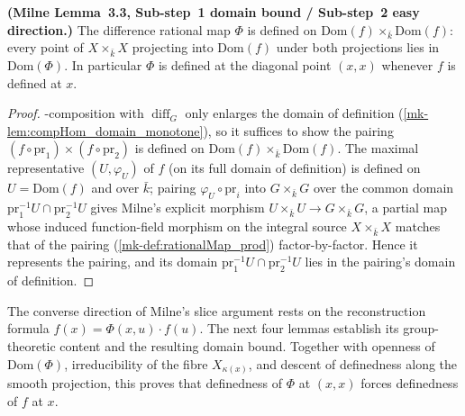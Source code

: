\begin{lemma}\label{mk-lem:difference_map_domain_lower_bound}
  \leanok

  \textbf{(Milne Lemma~3.3, Sub-step~1 domain bound / Sub-step~2 easy direction.)} The
  difference rational map \(\Phi\) is defined on \(\mathrm{Dom}(f) \times_{\bar k}
  \mathrm{Dom}(f)\): every point of \(X \times_{\bar k} X\) projecting into
  \(\mathrm{Dom}(f)\) under both projections lies in \(\mathrm{Dom}(\Phi)\). In
  particular \(\Phi\) is defined at the diagonal point \((x, x)\) whenever \(f\) is
  defined at \(x\).
\end{lemma}
\begin{proof}
  \leanokRight-composition with \(\operatorname{diff}_G\) only enlarges the domain of
  definition (\ref{mk-lem:compHom_domain_monotone}), so it suffices to show the pairing
  \((f \circ \mathrm{pr}_1) \times (f \circ \mathrm{pr}_2)\) is defined on
  \(\mathrm{Dom}(f) \times_{\bar k} \mathrm{Dom}(f)\). The maximal representative
  \((U, \varphi_U)\) of \(f\) (on its full domain of definition) is defined on \(U =
  \mathrm{Dom}(f)\) and over \(\bar k\); pairing \(\varphi_U \circ \mathrm{pr}_i\) into
  \(G \times_{\bar k} G\) over the common domain
  \(\mathrm{pr}_1^{-1}U \cap \mathrm{pr}_2^{-1}U\) gives Milne's explicit morphism
  \(U \times_{\bar k} U \to G \times_{\bar k} G\), a partial map whose induced
  function-field morphism on the integral source \(X \times_{\bar k} X\) matches that of
  the pairing (\ref{mk-def:rationalMap_prod}) factor-by-factor. Hence it represents the
  pairing, and its domain \(\mathrm{pr}_1^{-1}U \cap \mathrm{pr}_2^{-1}U\) lies in the
  pairing's domain of definition.
\end{proof}

The converse direction of Milne's slice argument rests on the reconstruction formula
\(f(x) = \Phi(x,u) \cdot f(u)\). The next four lemmas establish its group-theoretic
content and the resulting domain bound.  Together with openness of
\(\mathrm{Dom}(\Phi)\), irreducibility of the fibre \(X_{\kappa(x)}\), and descent of
definedness along the smooth projection, this proves that definedness of \(\Phi\) at
\((x,x)\) forces definedness of \(f\) at \(x\).

